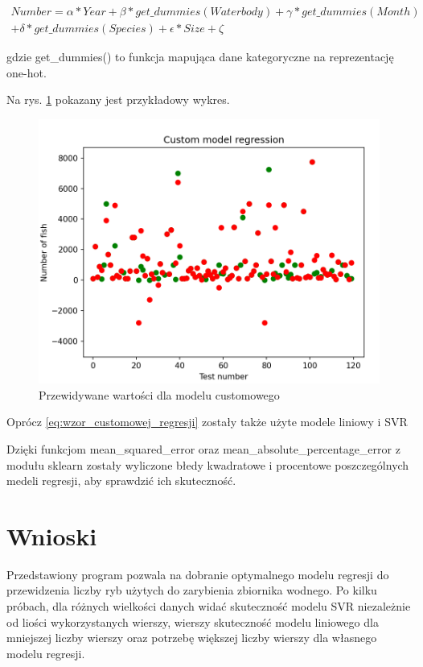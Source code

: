 \documentclass[10pt]{article}
\begin{document}
  \begin{equation*}
  \begin{multlined}
Number = \alpha * Year + \beta * get\_dummies(Waterbody) + \gamma * get\_dummies(Month)\\
 + \delta * get\_dummies(Species) + \epsilon * Size + \zeta
 \end{multlined}
 \label{eq:wzor_customowej_regresji}
\end{equation*}

gdzie get\_dummies() to funkcja mapująca dane kategoryczne na reprezentację one-hot.

Na rys. \ref{fig:wykres_customowej_regresji} pokazany jest przykładowy wykres. 

\begin{figure}[h]
\begin{center}
\includegraphics[width=0.8\linewidth]{Custom model regression.png}
\caption{Przewidywane wartości dla modelu customowego}
\label{fig:wykres_customowej_regresji}
\end{center}
\end{figure}

Oprócz \ref{eq:wzor_customowej_regresji} zostały także użyte modele liniowy i SVR

Dzięki funkcjom mean\_squared\_error oraz mean\_absolute\_percentage\_error z modułu sklearn zostały wyliczone błedy kwadratowe i procentowe poszczególnych medeli regresji, aby sprawdzić ich skuteczność.

\section{Wnioski}
Przedstawiony program pozwala na dobranie optymalnego modelu regresji do przewidzenia liczby ryb użytych do zarybienia zbiornika wodnego. Po kilku próbach, dla różnych wielkości danych widać skuteczność modelu SVR niezależnie od liości wykorzystanych wierszy, wierszy skuteczność modelu liniowego dla mniejszej liczby wierszy oraz potrzebę większej liczby wierszy dla własnego modelu regresji. 
\end{document}
